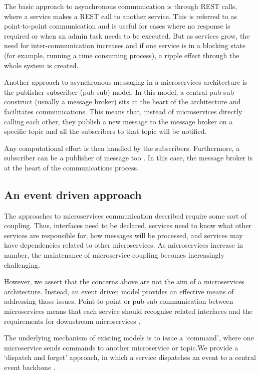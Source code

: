 \documentclass[runningheads]{llncs}
\begin{document}
The basic approach to asynchronous communication is through REST calls, where a service makes a REST call to another service. This is referred to as point-to-point communication and is useful for cases where no response is required or when an admin task needs to be executed. But as services grow, the need for inter-communication increases and if one service is in a blocking state (for example, running a time consuming process), a ripple effect through the whole system is created.

Another approach to asynchronous messaging in a microservices architecture is the publisher-subscriber (pub-sub) model. In this model, a central pub-sub construct (usually a message broker) sits at the heart of the architecture and facilitates communications. This means that, instead of microservices directly calling each other, they publish a new message to the message broker on a specific topic and all the subscribers to that topic will be notified.

Any computational effort is then handled by the subscribers. Furthermore, a subscriber can be a publisher of message too \cite{Indrasiri}. In this case, the message broker is at the heart of the communications process.

\subsection{An event driven approach}

The approaches to microservices communication described require some sort of coupling. Thus, interfaces need to be declared, services need to know what other services are responsible for, how messages will be processed, and services may have dependencies related to other microservices. As microservices increase in number, the maintenance of microservice coupling becomes increasingly challenging.

However, we assert that the concerns above are not the aim of a microservices architecture. Instead, an event driven model provides an effective means of addressing those issues. Point-to-point or pub-sub communication between microservices means that each service should recognise related interfaces and the requirements for downstream microservices \cite{Gupta,Molina}.

The underlying mechanism of existing models is to issue a ‘command’, where one microservice sends commands to another microservice or topic.We provide a ‘dispatch and forget’ approach, in which a service dispatches an event to a central event backbone \cite{Michelson}.
\end{document}
